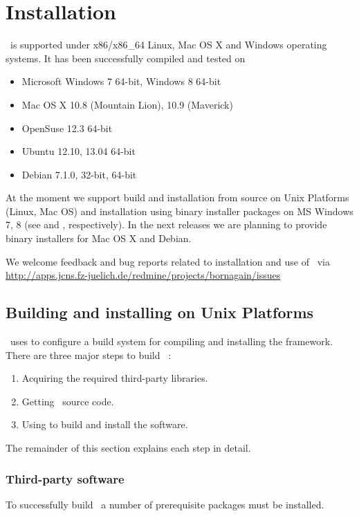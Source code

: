 \newpage
\chapter{Installation} 

\BornAgain\ is supported under x86/x86\_64 Linux, Mac OS X and Windows operating systems. 
It has been successfully compiled and tested on
\begin{itemize}
\item Microsoft Windows 7 64-bit, Windows 8 64-bit
\item Mac OS X 10.8 (Mountain Lion), 10.9 (Maverick)
\item OpenSuse 12.3 64-bit
\item Ubuntu 12.10, 13.04 64-bit
\item Debian 7.1.0, 32-bit, 64-bit
\end{itemize}

At the moment we support build and installation from source on Unix Platforms 
(Linux, Mac OS) and
installation using binary installer packages on MS Windows 7, 8 (see
 and , respectively).
In the next releases we are planning to provide binary installers for 
Mac OS X and Debian.

We welcome feedback and bug reports related to
installation and use of \BornAgain\
 via \url{http://apps.jcns.fz-juelich.de/redmine/projects/bornagain/issues}


\section{Building and installing on Unix Platforms} 


\BornAgain\ uses  to configure a build system for compiling and installing the framework. There are three major steps to build \BornAgain\ :
\begin{enumerate}[1.]
\item Acquiring the required third-party libraries.
\item Getting \BornAgain\ source code.
\item Using  to build and install the software.
\end{enumerate}
The remainder of this section explains each step in detail.

\subsection{Third-party software}
To successfully build \BornAgain\ a number of prerequisite packages must be installed.


